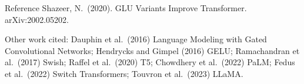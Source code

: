 \documentclass[aspectratio=169,11pt]{beamer}
\begin{document}
\begin{frame}{Reference}
  \small
  Shazeer, N.\ (2020). GLU Variants Improve Transformer. arXiv:2002.05202.
  \vspace{3mm}

  {\footnotesize Other work cited: Dauphin et al.\ (2016) Language Modeling with Gated Convolutional Networks; Hendrycks and Gimpel (2016) GELU; Ramachandran et al.\ (2017) Swish; Raffel et al.\ (2020) T5; Chowdhery et al.\ (2022) PaLM; Fedus et al.\ (2022) Switch Transformers; Touvron et al.\ (2023) LLaMA.}
\end{frame}
\end{document}
